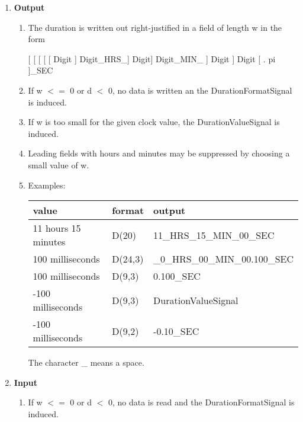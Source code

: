\begin{enumerate}
\item {\bf Output}\\
\begin{enumerate}
\item  The duration is written out right-justified in a field of length w in
the form

[ [ [ [ [ Digit ] Digit\_HRS\_] Digit]  Digit\_MIN\_ ] Digit ] Digit [ . pi ]\_SEC

\item If w $<=$ 0 or d $<$ 0, no data is written an the DurationFormatSignal
   is induced.

\item If w is too small for the given clock value, the DurationValueSignal
   is induced.

\item Leading fields with hours and minutes may be suppressed by 
choosing a small value of w. 

\item Examples:

\begin{tabular}{lll}
value               & format  & output \\ \hline
11 hours 15 minutes & D(20)   & 11\_HRS\_15\_MIN\_00\_SEC \\
100 milliseconds    & D(24,3) & \_0\_HRS\_00\_MIN\_00.100\_SEC \\
100 milliseconds    & D(9,3) & 0.100\_SEC \\
-100 milliseconds    & D(9,3) & DurationValueSignal \\
-100 milliseconds    & D(9,2) & -0.10\_SEC \\
\end{tabular}

The character \_ means a space.
\end{enumerate}

\item {\bf Input}\\
\begin{enumerate}
\item If w $<=$ 0 or d $<$ 0, no data is read and the DurationFormatSignal
   is induced.


\end{enumerate}
\end{enumerate}
